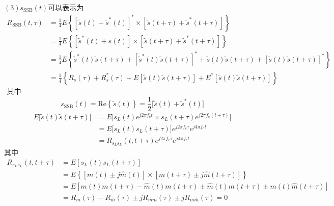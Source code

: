 \documentclass[utf8]{article}
\begin{document}
	$(3)s_{\mathrm{SSB}}(t)$可以表示为
	$$\begin{aligned}R_{\mathrm{SSB}}\left(t,\tau\right)&=\frac{1}{4}E\left\{\left[\tilde{s}\left(t\right)+\tilde{s}^{*}\left(t\right)\right]^{*}\times\left[\tilde{s}\left(t+\tau\right)+\tilde{s}^{*}\left(t+\tau\right)\right]\right\}\\&=\frac{1}{4}E\left\{\left[\tilde{s}^{*}\left(t\right)+s\left(t\right)\right]\times\left[\tilde{s}\left(t+\tau\right)+\tilde{s}^{*}\left(t+\tau\right)\right]\right\}\\&=\frac{1}{4}E\left\{\tilde{s}^{*}\left(t\right)\tilde{s}\left(t+\tau\right)+\left[\tilde{s}^{*}\left(t\right)\tilde{s}\left(t+\tau\right)\right]^{*}+\tilde{s}\left(t\right)\tilde{s}\left(t+\tau\right)+\left[\tilde{s}\left(t\right)\tilde{s}\left(t+\tau\right)\right]^{*}\right\}\\&=\frac{1}{4}\left\{R_{s}\left(\tau\right)+R_{s}^{*}\left(\tau\right)+E\left[\tilde{s}\left(t\right)\tilde{s}\left(t+\tau\right)\right]+E^{*}\left[\tilde{s}\left(t\right)\tilde{s}\left(t+\tau\right)\right]\right\}\\\text{其中}\end{aligned}$$
	$$s_{\mathrm{SSB}}\left(t\right)=\mathrm{Re}\left\{\tilde{s}\left(t\right)\right\}=\frac{1}{2}\Big[\tilde{s}\left(t\right)+\tilde{s}^{*}\left(t\right)\Big]$$
	$$\begin{aligned}E\Big[\tilde{s}\left(t\right)\tilde{s}\left(t+\tau\right)\Big]&=E\bigg[s_{L}\left(t\right)e^{j2\pi f_{c}t}\times s_{L}\left(t+\tau\right)e^{j2\pi f_{c}\left(t+\tau\right)}\bigg]\\&=E\bigg[s_{L}\left(t\right)s_{L}\left(t+\tau\right)\bigg]e^{j2\pi f_{c}\tau}e^{j4\pi f_{c}t}\\&=R_{s_{L}s_{L}}\left(t,t+\tau\right)e^{j2\pi f_{c}\tau}e^{j4\pi f_{c}t}\end{aligned}$$
	其中
	$$\begin{aligned}R_{s_{L}s_{L}}\left(t,t+\tau\right)&=E\left[s_{L}\left(t\right)s_{L}\left(t+\tau\right)\right]\\&=E\left\{\left[m\left(t\right)\pm j\hat{m}\left(t\right)\right]\times\left[m\left(t+\tau\right)\pm j\hat{m}\left(t+\tau\right)\right]\right\}\\&=E\left[m\left(t\right)m\left(t+\tau\right)-\hat{m}\left(t\right)m\left(t+\tau\right)\pm\hat{m}\left(t\right)m\left(t+\tau\right)\pm m\left(t\right)\hat{m}\left(t+\tau\right)\right]\\&=R_{m}\left(\tau\right)-R_{\hat{m}}\left(\tau\right)\pm jR_{\hat{m}m}\left(\tau\right)\pm jR_{m\hat{m}}\left(\tau\right)=0\end{aligned}$$
\end{document}
